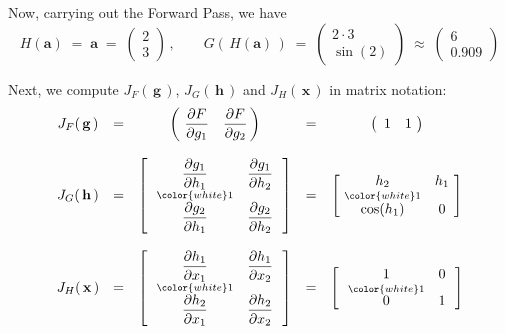 \vskip 0.5cm
\noindent
Now, carrying out the Forward Pass, we have
\begin{equation*}
H(\mathbf{a}) \; = \; \mathbf{a} \; = \; \left(\!\begin{array}{c} 2 \\ 3 \end{array}\!\right)\,,
\quad\quad
G(\,H(\mathbf{a})\,)
\; = \;
 	\left(\!\begin{array}{c} 2 \cdot 3 \\ \sin(2) \end{array}\!\right)
\; \approx \;
	\left(\!\begin{array}{c} 6 \\ 0.909 \end{array}\!\right)
\end{equation*}

\vskip 0.3cm
\noindent
Next, we compute
$J_{F}\!\left(\,\mathbf{g}\,\right)$,
$J_{G}\!\left(\,\mathbf{h}\,\right)$ and
$J_{H}\!\left(\,\mathbf{x}\,\right)$
in matrix notation:
\begin{equation*}
\begin{array}{ccccc}
	J_{F}\!\left(\,\mathbf{g}\,\right)
	& = &
	\left(\!\begin{array}{cc}
		\dfrac{\partial F}{\partial g_{1}} & \dfrac{\partial F}{\partial g_{2}}
		\end{array}\!\!\right)
	& = &
	\left(\begin{array}{cc}
		1 & 1
		\end{array}\!\right)
\\ \\
	J_{G}\!\left(\,\mathbf{h}\,\right)
	& = &
	\left[\,\begin{array}{cc}
		\dfrac{\partial g_{1}}{\partial h_{1}} & \dfrac{\partial g_{1}}{\partial h_{2}}
		\\
		\overset{{\color{white}1}}{\dfrac{\partial g_{2}}{\partial h_{1}}} & \dfrac{\partial g_{2}}{\partial h_{2}}
		\end{array}\,\right]
	& = &
	\left[\!\begin{array}{cc}
		h_{2} & h_{1}
		\\
		\overset{{\color{white}1}}{\cos(h_{1})} & 0
		\end{array}\!\right]
\\ \\
	J_{H}\!\left(\,\mathbf{x}\,\right)
	& = &
	\left[\,\begin{array}{cc}
		\dfrac{\partial h_{1}}{\partial x_{1}} & \dfrac{\partial h_{1}}{\partial x_{2}}
		\\
		\overset{{\color{white}1}}{\dfrac{\partial h_{2}}{\partial x_{1}}} & \dfrac{\partial h_{2}}{\partial x_{2}}
		\end{array}\,\right]
	& = &
	\left[\,\begin{array}{cc}
		1 & 0
		\\
		\overset{{\color{white}1}}{0} & 1
		\end{array}\,\right]
\end{array}
\end{equation*}
